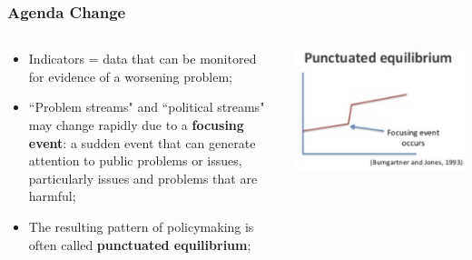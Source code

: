 \documentclass[aspectratio=169]{beamer}
\theoremstyle{principle}
\begin{document}
\begin{frame}
\frametitle{Agenda Change}
\begin{columns}

\begin{column}{0.5\textwidth}

\begin{itemize}
\item Indicators = data that can be monitored for evidence of a worsening problem;
\bigskip
\bigskip
\item ``Problem streams" and ``political streams" may change rapidly due to a \textbf{focusing event}: a sudden event that can generate attention to public problems or issues, particularly issues and problems that are harmful;
\bigskip
\bigskip
\item The resulting pattern of policymaking is often called \textbf{punctuated equilibrium};
\end{itemize}
\end{column}
\begin{column}{0.5\textwidth}
    \begin{center}
     \includegraphics[scale=0.5]{punctuated_eq.png}
     \end{center}
\end{column}
\end{columns}
\end{frame}

\end{document}
